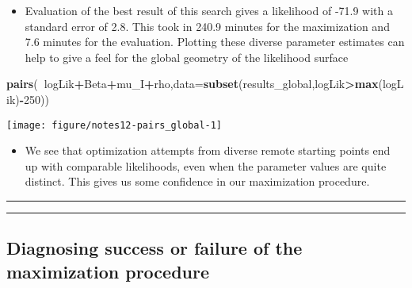 \documentclass[]{article}
\newenvironment{Shaded}{\begin{snugshade}}{\end{snugshade}}
\newcommand{\KeywordTok}[1]{\textcolor[rgb]{0.13,0.29,0.53}{\textbf{#1}}}
\newcommand{\DataTypeTok}[1]{\textcolor[rgb]{0.13,0.29,0.53}{#1}}
\newcommand{\DecValTok}[1]{\textcolor[rgb]{0.00,0.00,0.81}{#1}}
\newcommand{\OperatorTok}[1]{\textcolor[rgb]{0.81,0.36,0.00}{\textbf{#1}}}
\newcommand{\NormalTok}[1]{#1}
\providecommand{\tightlist}{%
  \setlength{\itemsep}{0pt}\setlength{\parskip}{0pt}}
\begin{document}
\begin{itemize}
\tightlist
\item
  Evaluation of the best result of this search gives a likelihood of
  -71.9 with a standard error of 2.8. This took in 240.9 minutes for the
  maximization and 7.6 minutes for the evaluation. Plotting these
  diverse parameter estimates can help to give a feel for the global
  geometry of the likelihood surface
\end{itemize}

\begin{Shaded}
\begin{Highlighting}[]
\KeywordTok{pairs}\NormalTok{(}\OperatorTok{~}\NormalTok{logLik}\OperatorTok{+}\NormalTok{Beta}\OperatorTok{+}\NormalTok{mu_I}\OperatorTok{+}\NormalTok{rho,}\DataTypeTok{data=}\KeywordTok{subset}\NormalTok{(results_global,logLik}\OperatorTok{>}\KeywordTok{max}\NormalTok{(logLik)}\OperatorTok{-}\DecValTok{250}\NormalTok{))}
\end{Highlighting}
\end{Shaded}

\begin{center}\texttt{[image: figure/notes12-pairs\_global-1]} \end{center}

\begin{itemize}
\tightlist
\item
  We see that optimization attempts from diverse remote starting points
  end up with comparable likelihoods, even when the parameter values are
  quite distinct. This gives us some confidence in our maximization
  procedure.
\end{itemize}

\begin{center}\rule{0.5\linewidth}{\linethickness}\end{center}

\begin{center}\rule{0.5\linewidth}{\linethickness}\end{center}

\subsection{Diagnosing success or failure of the maximization
procedure}\label{diagnosing-success-or-failure-of-the-maximization-procedure}
\end{document}
